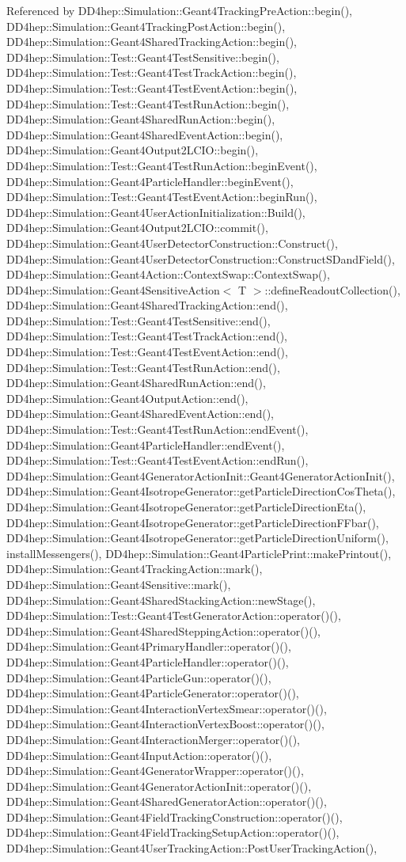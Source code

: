 Referenced by DD4hep::Simulation::Geant4TrackingPreAction::begin(), DD4hep::Simulation::Geant4TrackingPostAction::begin(), DD4hep::Simulation::Geant4SharedTrackingAction::begin(), DD4hep::Simulation::Test::Geant4TestSensitive::begin(), DD4hep::Simulation::Test::Geant4TestTrackAction::begin(), DD4hep::Simulation::Test::Geant4TestEventAction::begin(), DD4hep::Simulation::Test::Geant4TestRunAction::begin(), DD4hep::Simulation::Geant4SharedRunAction::begin(), DD4hep::Simulation::Geant4SharedEventAction::begin(), DD4hep::Simulation::Geant4Output2LCIO::begin(), DD4hep::Simulation::Test::Geant4TestRunAction::beginEvent(), DD4hep::Simulation::Geant4ParticleHandler::beginEvent(), DD4hep::Simulation::Test::Geant4TestEventAction::beginRun(), DD4hep::Simulation::Geant4UserActionInitialization::Build(), DD4hep::Simulation::Geant4Output2LCIO::commit(), DD4hep::Simulation::Geant4UserDetectorConstruction::Construct(), DD4hep::Simulation::Geant4UserDetectorConstruction::ConstructSDandField(), DD4hep::Simulation::Geant4Action::ContextSwap::ContextSwap(), DD4hep::Simulation::Geant4SensitiveAction$<$ T $>$::defineReadoutCollection(), DD4hep::Simulation::Geant4SharedTrackingAction::end(), DD4hep::Simulation::Test::Geant4TestSensitive::end(), DD4hep::Simulation::Test::Geant4TestTrackAction::end(), DD4hep::Simulation::Test::Geant4TestEventAction::end(), DD4hep::Simulation::Test::Geant4TestRunAction::end(), DD4hep::Simulation::Geant4SharedRunAction::end(), DD4hep::Simulation::Geant4OutputAction::end(), DD4hep::Simulation::Geant4SharedEventAction::end(), DD4hep::Simulation::Test::Geant4TestRunAction::endEvent(), DD4hep::Simulation::Geant4ParticleHandler::endEvent(), DD4hep::Simulation::Test::Geant4TestEventAction::endRun(), DD4hep::Simulation::Geant4GeneratorActionInit::Geant4GeneratorActionInit(), DD4hep::Simulation::Geant4IsotropeGenerator::getParticleDirectionCosTheta(), DD4hep::Simulation::Geant4IsotropeGenerator::getParticleDirectionEta(), DD4hep::Simulation::Geant4IsotropeGenerator::getParticleDirectionFFbar(), DD4hep::Simulation::Geant4IsotropeGenerator::getParticleDirectionUniform(), installMessengers(), DD4hep::Simulation::Geant4ParticlePrint::makePrintout(), DD4hep::Simulation::Geant4TrackingAction::mark(), DD4hep::Simulation::Geant4Sensitive::mark(), DD4hep::Simulation::Geant4SharedStackingAction::newStage(), DD4hep::Simulation::Test::Geant4TestGeneratorAction::operator()(), DD4hep::Simulation::Geant4SharedSteppingAction::operator()(), DD4hep::Simulation::Geant4PrimaryHandler::operator()(), DD4hep::Simulation::Geant4ParticleHandler::operator()(), DD4hep::Simulation::Geant4ParticleGun::operator()(), DD4hep::Simulation::Geant4ParticleGenerator::operator()(), DD4hep::Simulation::Geant4InteractionVertexSmear::operator()(), DD4hep::Simulation::Geant4InteractionVertexBoost::operator()(), DD4hep::Simulation::Geant4InteractionMerger::operator()(), DD4hep::Simulation::Geant4InputAction::operator()(), DD4hep::Simulation::Geant4GeneratorWrapper::operator()(), DD4hep::Simulation::Geant4GeneratorActionInit::operator()(), DD4hep::Simulation::Geant4SharedGeneratorAction::operator()(), DD4hep::Simulation::Geant4FieldTrackingConstruction::operator()(), DD4hep::Simulation::Geant4FieldTrackingSetupAction::operator()(), DD4hep::Simulation::Geant4UserTrackingAction::PostUserTrackingAction(), 
